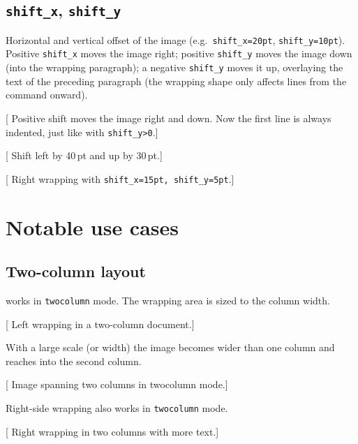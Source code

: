 \documentclass{article}
\begin{document}
\subsection{\texttt{shift\_x}, \texttt{shift\_y}}\label{macro:shift}

Horizontal and vertical offset of the image
(e.g.\ \texttt{shift\_x=20pt}, \texttt{shift\_y=10pt}).
Positive \texttt{shift\_x} moves the image right;
positive \texttt{shift\_y} moves the image down (into the wrapping
paragraph); a negative \texttt{shift\_y} moves it up, overlaying the
text of the preceding paragraph (the wrapping shape only affects
lines from the \texttt{\string\wrapgraphics} command onward).

[
  Positive shift moves the image right and down.
  Now the first line is always indented, just like with \texttt{shift\_y>0}.]

[
  Shift left by 40\,pt and up by 30\,pt.]

[
  Right wrapping with \texttt{shift\_x=15pt, shift\_y=5pt}.]


\section{Notable use cases}

\subsection{Two-column layout}\label{usecase:twocolumn}

\texttt{\string\wrapgraphics} works in \texttt{twocolumn} mode.
The wrapping area is sized to the column width.

[
  Left wrapping in a two-column document.]

With a large scale (or width) the image becomes wider than one column
and reaches into the second column.

[
  Image spanning two columns in twocolumn mode.]

Right-side wrapping also works in \texttt{twocolumn} mode.

[
  Right wrapping in two columns with more text.]
\end{document}
